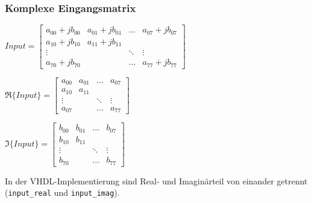 \begin{frame}\frametitle{Komplexe Eingangsmatrix}

\begin{center}
\begingroup %
\setlength\arraycolsep{3pt}
 $Input = \begin{bmatrix}
           a_{00}+jb_{00}  &  a_{01}+jb_{01} & \dots  & a_{07}+jb_{07}\\
           a_{10}+jb_{10}  &  a_{11}+jb_{11} &        &               \\
           \vdots          &                 & \ddots & \vdots \\
           a_{70}+jb_{70}  &                 & \dots  & a_{77}+jb_{77}
  \end{bmatrix}$
\endgroup
\end{center}

\vspace{0.5cm}
 
\begin{minipage}{0.45\textwidth}
\begingroup %
\setlength\arraycolsep{3pt}
 $\Re\{Input\} = \begin{bmatrix}
           a_{00} &  a_{01} & \dots  & a_{07}\\
           a_{10} &  a_{11} &        &               \\
           \vdots          &                 & \ddots & \vdots \\
           a_{07}  &                 & \dots  & a_{77}
  \end{bmatrix}$
\endgroup  
\end{minipage}
\begin{minipage}{0.45\textwidth}
\begingroup %
\setlength\arraycolsep{3pt}
 $\Im\{Input\} = \begin{bmatrix}
           b_{00} &  b_{01} & \dots  & b_{07}\\
           b_{10} &  b_{11} &        &               \\
           \vdots &         & \ddots & \vdots \\
           b_{70} &         & \dots  & b_{77}
  \end{bmatrix}$
\endgroup  
\end{minipage}  

\vspace{0.5cm}

In der VHDL-Implementierung sind Real- und Imaginärteil von einander getrennt (\texttt{input\_real} und \texttt{input\_imag}).
  
\end{frame}



